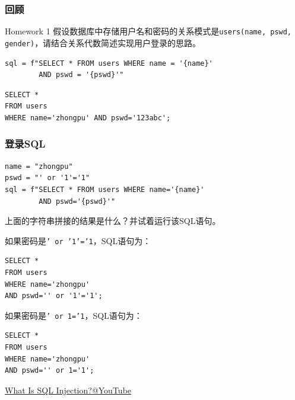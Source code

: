 \documentclass[aspectratio=169, 14pt]{beamer}
\begin{document}
\begin{frame}[fragile]
	\frametitle{回顾}
	\begin{exampleblock}{Homework 1}
		假设数据库中存储用户名和密码的关系模式是\texttt{users(name, pswd, gender)}，请结合关系代数简述实现用户登录的思路。
	\end{exampleblock}

	\begin{verbatim}
sql = f"SELECT * FROM users WHERE name = '{name}'
        AND pswd = '{pswd}'"
\end{verbatim}

	\begin{verbatim}
SELECT *
FROM users
WHERE name='zhongpu' AND pswd='123abc';
\end{verbatim}

\end{frame}

\begin{frame}[fragile]
	\frametitle{登录SQL}

	\begin{verbatim}
name = "zhongpu"
pswd = "' or '1'='1"
sql = f"SELECT * FROM users WHERE name='{name}'
        AND pswd='{pswd}'"
    \end{verbatim}

	 上面的字符串拼接的结果是什么？并试着运行该SQL语句。
\end{frame}

\begin{frame}[fragile]

	如果密码是\alert{\texttt{' or '1'='1}}，SQL语句为：

	\begin{verbatim}
SELECT * 
FROM users 
WHERE name='zhongpu' 
AND pswd='' or '1'='1';
\end{verbatim}

	\pause
	如果密码是\alert{\texttt{' or 1='1}}，SQL语句为：

	\begin{verbatim}
SELECT *
FROM users
WHERE name='zhongpu'
AND pswd='' or 1='1';
\end{verbatim}

\end{frame}

\begin{frame}
	\href{https://www.youtube.com/watch?v=wcaiKgQU6VE}{What Is SQL Injection?@YouTube}


\end{frame}
\end{document}
